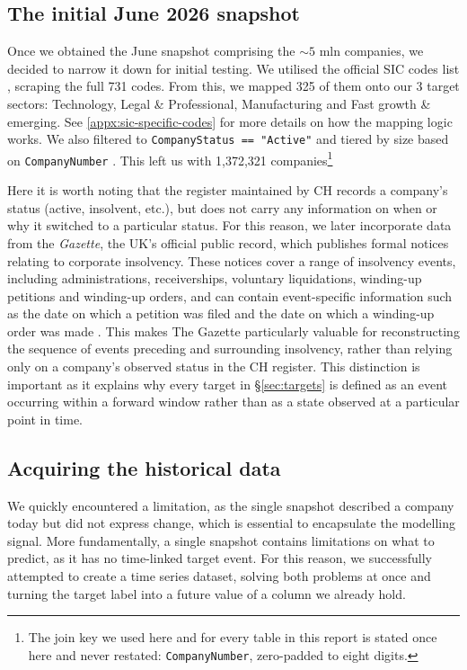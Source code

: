 \documentclass[    author={Samuel Menon Demelo; Sneha Saphala Ram Prasad; 
Viktor Ander Lindholm; Vishal Khatri},
               supervisor={Prof. Fernando Moreno-Pino},
                   degree={MSc},
                    title={Lloyds Commercial Banking Intelligence},
                 subtitle={Ranking SME Lending, Risk and Growth Prospects for Lloyds Banking Group},
                     type={},
                     year={2026}]{dissertation}
\begin{document}
\subsection{The initial June 2026 snapshot}
Once we obtained the June snapshot comprising the $\sim5$ mln companies, we decided to narrow it down for initial testing. We utilised the official SIC codes list \cite{companieshouse_sic}, scraping the full 731 codes. From this, we mapped 325 of them onto our 3 target sectors: Technology, Legal \& Professional, Manufacturing and Fast growth \& emerging. See \ref{appx:sic-specific-codes} for more details on how the mapping logic works. We also filtered to \texttt{CompanyStatus == "Active"} and tiered by size based on \texttt{CompanyNumber} \cite{companieshouse_accounts_2026}. This left us with 1,372,321 companies\footnote{The join key we used here and for every table in this report is stated once here and never restated: \texttt{CompanyNumber}, zero-padded to eight digits.}

Here it is worth noting that the register maintained by CH records a company's status (active, insolvent, etc.), but does not carry any information on when or why it switched to a particular status. For this reason, we later incorporate data from the \textit{Gazette}, the UK's official public record, which publishes formal notices relating to corporate insolvency. These notices cover a range of insolvency events, including administrations, receiverships, voluntary liquidations, winding-up petitions and winding-up orders, and can contain event-specific information such as the date on which a petition was filed and the date on which a winding-up order was made \cite{gazette_insolvency}. This makes The Gazette particularly valuable for reconstructing the sequence of events preceding and surrounding insolvency, rather than relying only on a company's observed status in the CH register. This distinction is important as it explains why every target in \S\ref{sec:targets} is defined as an event occurring within a forward window rather than as a state observed at a particular point in time.

\subsection{Acquiring the historical data}
We quickly encountered a limitation, as the single snapshot described a company today but did not express change, which is essential to encapsulate the modelling signal. More fundamentally, a single snapshot contains limitations on what to predict, as it has no time-linked target event. For this reason, we successfully attempted to create a time series dataset, solving both problems at once and turning the target label into a future value of a column we already hold.
\end{document}
